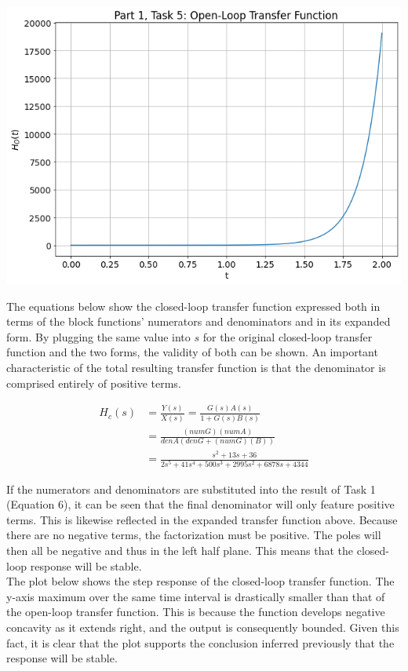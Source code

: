 \documentclass[12pt]{report}
\begin{document}
\begin{center}
	\includegraphics[scale = 0.6]{Lab 7 - Plots/Part1-Task5.png}\\[1.0 cm]
\end{center}

The equations below show the closed-loop transfer function expressed both in terms of the block functions' numerators and denominators and in its expanded form. By plugging the same value into $ s $ for the original closed-loop transfer function and the two forms, the validity of both can be shown. An important characteristic of the total resulting transfer function is that the denominator is comprised entirely of positive terms.

\begin{align*}
	H_c(s) &= \frac{Y(s)}{X(s)} = \frac{G(s)A(s)}{1 + G(s)B(s)} \\
	&= \frac{(numG)(numA)}{denA(denG + (numG)(B))} \\
	&= \frac{s^2 + 13s + 36}{2s^5 + 41s^4 + 500s^3 + 2995s^2 + 6878s + 4344}
\end{align*}

If the numerators and denominators are substituted into the result of Task 1 (Equation 6), it can be seen that the final denominator will only feature positive terms. This is likewise reflected in the expanded transfer function above. Because there are no negative terms, the factorization must be positive. The poles will then all be negative and thus in the left half plane. This means that the closed-loop response will be stable. \\ 

The plot below shows the step response of the closed-loop transfer function. The y-axis maximum over the same time interval is drastically smaller than that of the open-loop transfer function. This is because the function develops negative concavity as it extends right, and the output is consequently bounded. Given this fact, it is clear that the plot supports the conclusion inferred previously that the response will be stable. \\ 
	
\end{document}
